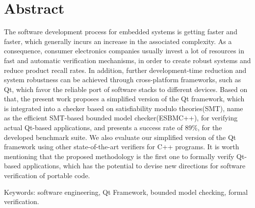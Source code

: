 \chapter*{Abstract}
\thispagestyle{empty}


The software development process for embedded systems is getting faster and faster, which generally incurs an increase in the associated complexity. As a consequence, consumer electronics companies usually invest a lot of resources in fast and automatic verification mechanisms, in order to create robust systems and reduce product recall rates. In addition, further development-time reduction and system robustness can be achieved through cross-platform frameworks, such as Qt, which favor the reliable port of software stacks to different devices. Based on that, the present work proposes a simplified version of the Qt framework, which is integrated into a checker based on satisfiability modulo theories(SMT), name as the efficient SMT-based bounded model checker(ESBMC++), for verifying actual Qt-based applications, and presents a success rate of 89\%, for the developed benchmark suite. We also evaluate our simplified version of the Qt framework using other state-of-the-art verifiers for C++ programs. It is worth mentioning that the proposed methodology is the first one to formally verify Qt-based applications, which has the potential to devise new directions for software verification of portable code.


\noindent \textsf{Keywords:} software engineering, Qt Framework, bounded model checking, formal verification.


\cleardoublepage
